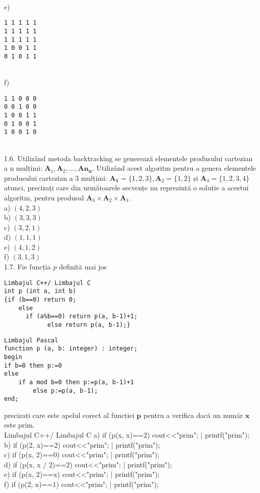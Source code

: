 \\
e) \begin{verbatim}
1 1 1 1 1
1 1 1 1 1
1 1 1 1 1
1 0 0 1 1
0 1 0 1 1
\end{verbatim}
\\
f) \begin{verbatim}
1 1 0 0 0
0 0 1 0 0
1 0 0 1 1
0 1 0 0 1
1 0 0 1 0
\end{verbatim}
\\
1.6. Utilizând metoda backtracking se generează elementele produsului cartezian a n mulțimi: $\mathbf{A}_{1}, \mathbf{A}_{2}, \ldots, \mathbf{A n}_{\mathbf{n}}$. Utilizând acest algoritm pentru a genera elementele produsului cartezian a 3 mulțimi: $\mathbf{A}_{\mathbf{1}}=\{1,2,3\}, \mathbf{A}_{2}=\{1,2\}$ și $\mathbf{A}_{3}=\{1,2,3,4\}$ atunci, precizați care din următoarele secvențe nu reprezintă o soluție a acestui algoritm, pentru produsul $\mathbf{A}_{3} \times \mathbf{A}_{2} \times \mathbf{A}_{1}$.
\\
a) $(4,2,3)$
\\
b) $(3,3,3)$
\\
c) $(3,2,1)$
\\
d) $(1,1,1)$
\\
e) $(4,1,2)$
\\
f) $(3,1,3)$
\\
1.7. Fie funcția $p$ definită mai jos
\begin{verbatim}
Limbajul C++/ Limbajul C
int p (int a, int b)
{if (b==0) return 0;
    else
      if (a%b==0) return p(a, b-1)+1;
            else return p(a, b-1);}
\end{verbatim}
\begin{verbatim}
Limbajul Pascal
function p (a, b: integer) : integer;
begin
if b=0 then p:=0
else
    if a mod b=0 then p:=p(a, b-1)+1
        else p:=p(a, b-1);
end;
\end{verbatim}
precizați care este apelul corect al funcției $\mathbf{p}$ pentru a verifica dacă un număr $\mathbf{x}$ este prim.
\\
Limbajul C++/ Limbajul C
a) if (p(x, x)==2) cout<<"prim"; | printf("prim");
\\
b) if (p(2, x)==2) cout<<"prim"; | printf("prim");
\\
c) if (p(x, 2)==0) cout<<"prim"; | printf("prim");
\\
d) if (p(x, x / 2)==2) cout<<"prim"; | printf("prim");
\\
e) if (p(x, 2)==x) cout<<"prim"; | printf("prim");
\\
f) if (p(2, x)==1) cout<<"prim"; | printf("prim");
